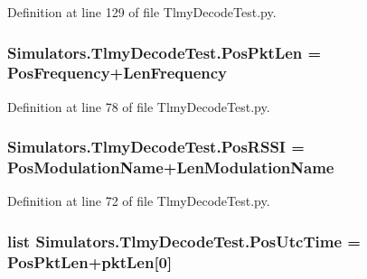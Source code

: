 Definition at line 129 of file Tlmy\+Decode\+Test.\+py.

\hypertarget{namespace_simulators_1_1_tlmy_decode_test_a6bc68f210f3bc5ee61a6c1855f717e26}{}
\subsubsection[{Pos\+Pkt\+Len}]{\setlength{\rightskip}{0pt plus 5cm}Simulators.\+Tlmy\+Decode\+Test.\+Pos\+Pkt\+Len = {\bf Pos\+Frequency}+{\bf Len\+Frequency}}\label{namespace_simulators_1_1_tlmy_decode_test_a6bc68f210f3bc5ee61a6c1855f717e26}


Definition at line 78 of file Tlmy\+Decode\+Test.\+py.

\hypertarget{namespace_simulators_1_1_tlmy_decode_test_a7512223917a7b29e6f1edf7bd1a4174f}{}
\subsubsection[{Pos\+R\+S\+S\+I}]{\setlength{\rightskip}{0pt plus 5cm}Simulators.\+Tlmy\+Decode\+Test.\+Pos\+R\+S\+S\+I = {\bf Pos\+Modulation\+Name}+{\bf Len\+Modulation\+Name}}\label{namespace_simulators_1_1_tlmy_decode_test_a7512223917a7b29e6f1edf7bd1a4174f}


Definition at line 72 of file Tlmy\+Decode\+Test.\+py.

\hypertarget{namespace_simulators_1_1_tlmy_decode_test_ab13e258c882d801c05c859e129a025e8}{}
\subsubsection[{Pos\+Utc\+Time}]{\setlength{\rightskip}{0pt plus 5cm}list Simulators.\+Tlmy\+Decode\+Test.\+Pos\+Utc\+Time = {\bf Pos\+Pkt\+Len}+{\bf pkt\+Len}\mbox{[}0\mbox{]}}\label{namespace_simulators_1_1_tlmy_decode_test_ab13e258c882d801c05c859e129a025e8}



